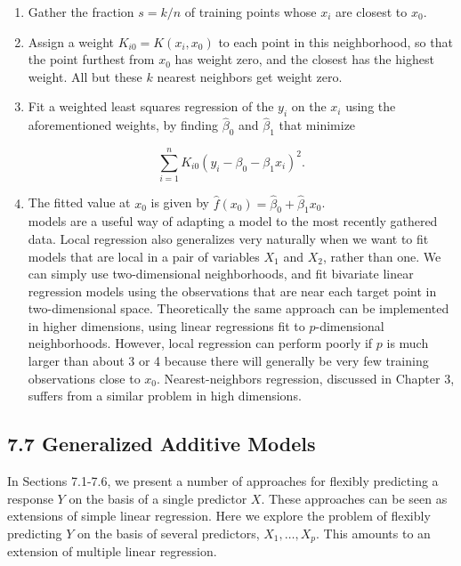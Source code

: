 \documentclass[10pt]{article}
\begin{document}
\begin{enumerate}
  \item Gather the fraction $s=k / n$ of training points whose $x_{i}$ are closest to $x_{0}$.
  \item Assign a weight $K_{i 0}=K\left(x_{i}, x_{0}\right)$ to each point in this neighborhood, so that the point furthest from $x_{0}$ has weight zero, and the closest has the highest weight. All but these $k$ nearest neighbors get weight zero.
  \item Fit a weighted least squares regression of the $y_{i}$ on the $x_{i}$ using the aforementioned weights, by finding $\hat{\beta}_{0}$ and $\hat{\beta}_{1}$ that minimize
\end{enumerate}


\begin{equation*}
\sum_{i=1}^{n} K_{i 0}\left(y_{i}-\beta_{0}-\beta_{1} x_{i}\right)^{2} . \tag{7.14}
\end{equation*}


\begin{enumerate}
  \setcounter{enumi}{3}
  \item The fitted value at $x_{0}$ is given by $\hat{f}\left(x_{0}\right)=\hat{\beta}_{0}+\hat{\beta}_{1} x_{0}$.\\
models are a useful way of adapting a model to the most recently gathered data. Local regression also generalizes very naturally when we want to fit models that are local in a pair of variables $X_{1}$ and $X_{2}$, rather than one. We can simply use two-dimensional neighborhoods, and fit bivariate linear regression models using the observations that are near each target point in two-dimensional space. Theoretically the same approach can be implemented in higher dimensions, using linear regressions fit to $p$-dimensional neighborhoods. However, local regression can perform poorly if $p$ is much larger than about 3 or 4 because there will generally be very few training observations close to $x_{0}$. Nearest-neighbors regression, discussed in Chapter 3, suffers from a similar problem in high dimensions.
\end{enumerate}

\subsection*{7.7 Generalized Additive Models}
In Sections 7.1-7.6, we present a number of approaches for flexibly predicting a response $Y$ on the basis of a single predictor $X$. These approaches can be seen as extensions of simple linear regression. Here we explore the problem of flexibly predicting $Y$ on the basis of several predictors, $X_{1}, \ldots, X_{p}$. This amounts to an extension of multiple linear regression.
\end{document}
